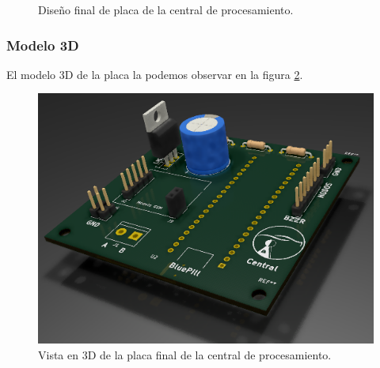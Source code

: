 \begin{figure}[!h]
\begin{center}
    \caption{Diseño final de placa de la central de procesamiento.}
	\label{im:pcb-final}
\end{center}
\end{figure}

\subsubsection{Modelo 3D}
El modelo 3D de la placa la podemos observar en la figura \ref{im:mod-3d-central}.

\begin{figure}[!h]
	\centering
	\includegraphics[scale=.55]{images/central/Central-perspectiva.png}
    \caption{Vista en 3D de la placa final de la central de procesamiento.}
	\label{im:mod-3d-central}
\end{figure}

